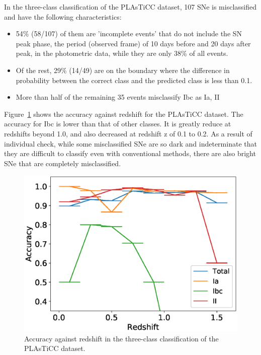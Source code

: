 \documentclass[useamsfonts]{pasj01}
\begin{document}
In the three-class classification of the PLAsTiCC dataset,
107 SNe is misclassified and have the following characteristics:
\begin{itemize}
\item 54\% (58/107) of them are 'incomplete events' that do not include the SN peak phase, the period (observed frame) of 10 days before and 20 days after peak, in the photometric data, while they are only 38\% of all events.
\item Of the rest, 29\% (14/49) are on the boundary where the difference in probability between the correct class and the predicted class is less than 0.1.
\item More than half of the remaining 35 events misclassify Ibc as Ia, II
\end{itemize}
Figure\ \ref{fig:misclass_rate_3class} shows the accuracy against redshift for the PLAsTiCC dataset.
The accuracy for Ibc is lower than that of other classes.
It is greatly reduce at redshifts beyond 1.0, and also decreased at redshift z of 0.1 to 0.2.
As a result of individual check, while some misclassified SNe are so dark and indeterminate that they are difficult to classify even with conventional methods, there are also bright SNe that are completely misclassified.
%
\begin{figure}[htbp]
  \begin{center}
     \includegraphics[width=\columnwidth]{figures/misclass_rate_plastic_3class.eps}
  \end{center}
  \caption{%
  Accuracy against redshift in the three-class classification of the PLAsTiCC dataset.
  }%
  \label{fig:misclass_rate_3class}
\end{figure}
%
%
\end{document}

